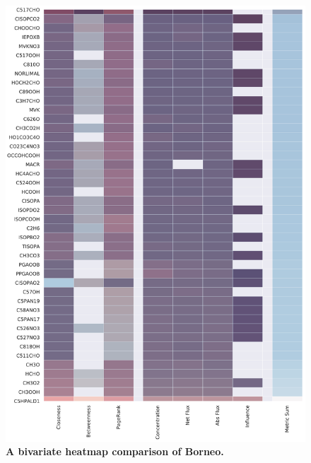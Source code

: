 \begin{figure}[H]
     \centering
         \includegraphics[width=.95\textwidth]{figures_c3/mlpregressor/op3_Borneo.pdf}
        \caption{ \textbf{A bivariate heatmap comparison of Borneo.} }
        \label{fig:heatb}
\end{figure}

